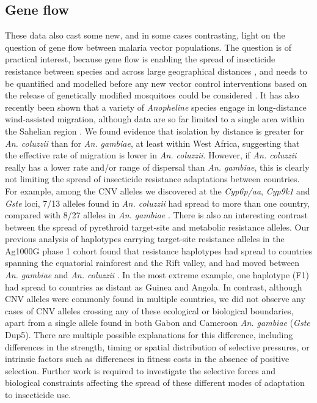 \documentclass[a4paper,11pt,abstracton,hidelinks]{scrartcl}
\begin{document}
\subsection*{Gene flow}


%
These data also cast some new, and in some cases contrasting, light on the question of gene flow between malaria vector populations.
%
The question is of practical interest, because gene flow is enabling the spread of insecticide resistance between species and across large geographical distances \cite{Ag1000G2017, Clarkson2018}, and needs to be quantified and modelled before any new vector control interventions based on the release of genetically modified mosquitoes could be considered \cite{North2018}.
%
It has also recently been shown that a variety of \textit{Anopheline} species engage in long-distance wind-assisted migration, although data are so far limited to a single area within the Sahelian region \cite{Huestis2019}.
%
We found evidence that isolation by distance is greater for \textit{An. coluzzii} than for \textit{An. gambiae}, at least within West Africa, suggesting that the effective rate of migration is lower in \textit{An. coluzzii}. 
%
However, if \textit{An. coluzzii} really has a lower rate and/or range of dispersal than \textit{An. gambiae}, this is clearly not limiting the spread of insecticide resistance adaptations between countries.
%
For example, among the CNV alleles we discovered at the \textit{Cyp6p/aa}, \textit{Cyp9k1} and \textit{Gste} loci, 7/13 alleles found in \textit{An. coluzzii} had spread to more than one country, compared with 8/27 alleles in \textit{An. gambiae} \cite{Lucas2019a}.
%
There is also an interesting contrast between the spread of pyrethroid target-site and metabolic resistance alleles.
%
Our previous analysis of haplotypes carrying target-site resistance alleles in the Ag1000G phase 1 cohort found that resistance haplotypes had spread to countries spanning the equatorial rainforest and the Rift valley, and had moved between \textit{An. gambiae} and \textit{An. coluzzii} \cite{Ag1000G2017, Clarkson2018}.
%
In the most extreme example, one haplotype (F1) had spread to countries as distant as Guinea and Angola.
%
In contrast, although CNV alleles were commonly found in multiple countries, we did not observe any cases of CNV alleles crossing any of these ecological or biological boundaries, apart from a single allele found in both Gabon and Cameroon \textit{An. gambiae} (\textit{Gste} Dup5).
%
There are multiple possible explanations for this difference, including differences in the strength, timing or spatial distribution of selective pressures, or intrinsic factors such as differences in fitness costs in the absence of positive selection.
%
Further work is required to investigate the selective forces and biological constraints affecting the spread of these different modes of adaptation to insecticide use.
\end{document}
